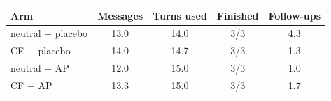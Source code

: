 \begin{tabular}{lcccc}
\toprule
Arm & Messages & Turns used & Finished & Follow-ups \\
\midrule
neutral + placebo & 13.0 & 14.0 & 3/3 & 4.3 \\
CF + placebo & 14.0 & 14.7 & 3/3 & 1.3 \\
neutral + AP & 12.0 & 15.0 & 3/3 & 1.0 \\
CF + AP & 13.3 & 15.0 & 3/3 & 1.7 \\
\bottomrule
\end{tabular}
